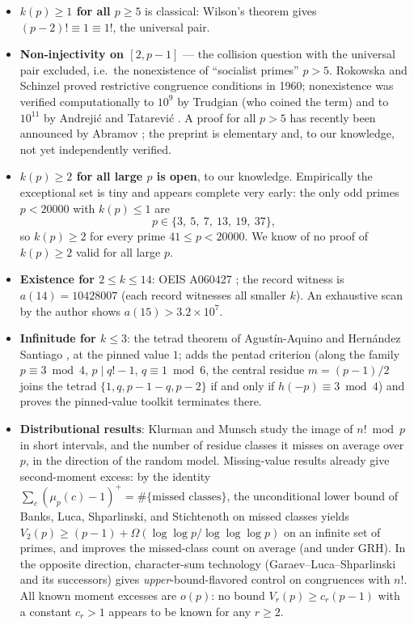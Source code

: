 \documentclass[11pt]{article}
\theoremstyle{definition}
\theoremstyle{remark}
\begin{document}
\begin{itemize}
  \item \textbf{$k(p) \ge 1$ for all $p \ge 5$} is classical: Wilson's
    theorem gives $(p-2)! \equiv 1 \equiv 1!$, the universal pair.
  \item \textbf{Non-injectivity on $[2, p-1]$} --- the collision question
    with the universal pair excluded, i.e.\ the nonexistence of
    ``socialist primes'' $p > 5$. Rokowska and Schinzel \cite{RS} proved
    restrictive congruence conditions in 1960; nonexistence was verified
    computationally to $10^9$ by Trudgian \cite{Tr} (who coined the term)
    and to $10^{11}$ by Andreji\'c and Tatarevi\'c \cite{AT}. A proof for
    all $p > 5$ has recently been announced by Abramov \cite{Ab26}; the
    preprint is elementary and, to our knowledge, not yet independently
    verified.
  \item \textbf{$k(p) \ge 2$ for all large $p$ is open}, to our knowledge.
    Empirically the exceptional set is tiny and appears complete very
    early: the only odd primes $p < 20000$ with $k(p) \le 1$ are
    \[
      p \in \{3,\ 5,\ 7,\ 13,\ 19,\ 37\},
    \]
    so $k(p) \ge 2$ for every prime $41 \le p < 20000$. We know of no
    proof of $k(p) \ge 2$ valid for all large $p$.
  \item \textbf{Existence for $2 \le k \le 14$}: OEIS A060427 \cite{OEIS};
    the record witness is $a(14) = 10428007$ (each record witnesses all
    smaller $k$). An exhaustive scan by the author shows
    $a(15) > 3.2 \times 10^7$.
  \item \textbf{Infinitude for $k \le 3$}: the tetrad theorem of
    Agust\'in-Aquino and Hern\'andez Santiago \cite{AAHS}, at the pinned
    value $1$; \cite{Hino} adds the pentad criterion (along the family
    $p \equiv 3 \bmod 4$, $p \mid q! - 1$, $q \equiv 1 \bmod 6$, the
    central residue $m = (p-1)/2$ joins the tetrad
    $\{1, q, p-1-q, p-2\}$ if and only if $h(-p) \equiv 3 \bmod 4$) and
    proves the pinned-value toolkit terminates there.
  \item \textbf{Distributional results}: Klurman and Munsch \cite{KM}
    study the image of $n! \bmod p$ in short intervals, and the number of
    residue classes it misses on average over $p$, in the direction of
    the random model. Missing-value results already give second-moment
    excess: by the identity $\sum_c (\mu_p(c) - 1)^+ = \#\{\text{missed
    classes}\}$, the unconditional lower bound of Banks, Luca,
    Shparlinski, and Stichtenoth \cite{BLSS} on missed classes yields
    $V_2(p) \ge (p-1) + \Omega(\log\log p / \log\log\log p)$ on an
    infinite set of primes, and \cite{KM} improves the missed-class count
    on average (and under GRH). In the opposite direction, character-sum
    technology (Garaev--Luca--Shparlinski \cite{GLS} and its successors)
    gives \emph{upper}-bound-flavored control on congruences with $n!$.
    All known moment excesses are $o(p)$: no bound
    $V_r(p) \ge c_r (p-1)$ with a constant $c_r > 1$ appears to be known
    for any $r \ge 2$.
\end{itemize}
\end{document}
